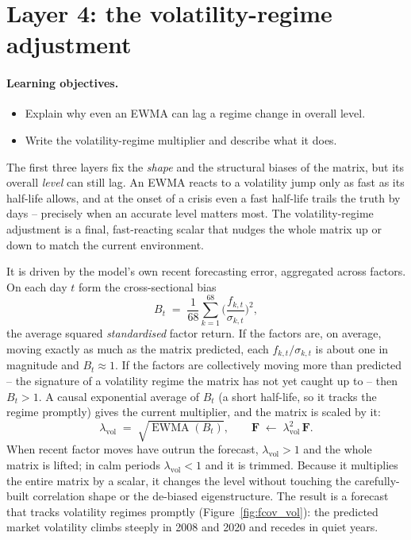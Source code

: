 \documentclass[11pt]{article}
\theoremstyle{definition}
\theoremstyle{plain}
\theoremstyle{remark}
\newcommand{\Fmat}{\mathbf{F}}
\begin{document}
\section{Layer 4: the volatility-regime adjustment}\label{sec:vra}

\paragraph{Learning objectives.}
\begin{itemize}[leftmargin=1.4em,topsep=2pt]
  \item Explain why even an EWMA can lag a regime change in overall level.
  \item Write the volatility-regime multiplier and describe what it does.
\end{itemize}

The first three layers fix the \emph{shape} and the structural biases of the matrix, but its overall \emph{level} can still lag. An EWMA reacts to a volatility jump only as fast as its half-life allows, and at the onset of a crisis even a fast half-life trails the truth by days -- precisely when an accurate level matters most. The volatility-regime adjustment is a final, fast-reacting scalar that nudges the whole matrix up or down to match the current environment.

It is driven by the model's own recent forecasting error, aggregated across factors. On each day $t$ form the cross-sectional bias
\[
B_t \;=\; \frac{1}{68}\sum_{k=1}^{68}\Big(\frac{f_{k,t}}{\sigma_{k,t}}\Big)^{2},
\]
the average squared \emph{standardised} factor return. If the factors are, on average, moving exactly as much as the matrix predicted, each $f_{k,t}/\sigma_{k,t}$ is about one in magnitude and $B_t\approx 1$. If the factors are collectively moving more than predicted -- the signature of a volatility regime the matrix has not yet caught up to -- then $B_t>1$. A causal exponential average of $B_t$ (a short half-life, so it tracks the regime promptly) gives the current multiplier, and the matrix is scaled by it:
\[
\lambda_{\text{vol}} \;=\; \sqrt{\operatorname{EWMA}(B_t)},
\qquad
\Fmat \;\leftarrow\; \lambda_{\text{vol}}^{2}\,\Fmat .
\]
When recent factor moves have outrun the forecast, $\lambda_{\text{vol}}>1$ and the whole matrix is lifted; in calm periods $\lambda_{\text{vol}}<1$ and it is trimmed. Because it multiplies the entire matrix by a scalar, it changes the level without touching the carefully-built correlation shape or the de-biased eigenstructure. The result is a forecast that tracks volatility regimes promptly (Figure~\ref{fig:fcov_vol}): the predicted market volatility climbs steeply in 2008 and 2020 and recedes in quiet years.
\end{document}
